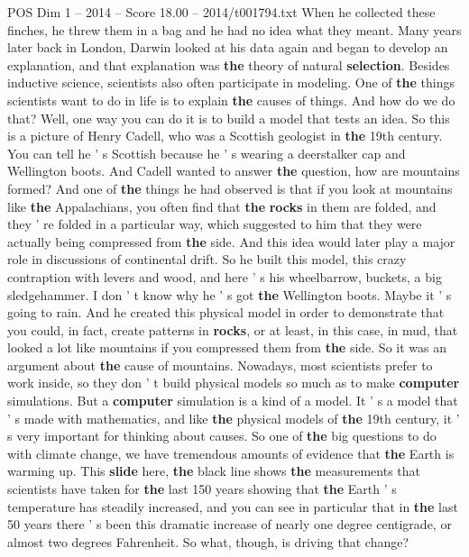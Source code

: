 \begin{textsample}{POS Dim 1 – 2014 – Score 18.00 – 2014/t001794.txt}
When he collected these finches, he threw them in a bag and he had no idea what they meant.
Many years later back in London, Darwin looked at his data again and began to develop an explanation, and that explanation was \textbf{the} theory of natural \textbf{selection}.
Besides inductive science, scientists also often participate in modeling.
One of \textbf{the} things scientists want to do in life is to explain \textbf{the} causes of things.
And how do we do that?
Well, one way you can do it is to build a model that tests an idea.
So this is a picture of Henry Cadell, who was a Scottish geologist in \textbf{the} 19th century.
You can tell he ' s Scottish because he ' s wearing a deerstalker cap and Wellington boots.
And Cadell wanted to answer \textbf{the} question, how are mountains formed?
And one of \textbf{the} things he had observed is that if you look at mountains like \textbf{the} Appalachians, you often find that \textbf{the} \textbf{rocks} in them are folded, and they ' re folded in a particular way, which suggested to him that they were actually being compressed from \textbf{the} side.
And this idea would later play a major role in discussions of continental drift.
So he built this model, this crazy contraption with levers and wood, and here ' s his wheelbarrow, buckets, a big sledgehammer.
I don ' t know why he ' s got \textbf{the} Wellington boots.
Maybe it ' s going to rain.
And he created this physical model in order to demonstrate that you could, in fact, create patterns in \textbf{rocks}, or at least, in this case, in mud, that looked a lot like mountains if you compressed them from \textbf{the} side.
So it was an argument about \textbf{the} cause of mountains.
Nowadays, most scientists prefer to work inside, so they don ' t build physical models so much as to make \textbf{computer} simulations.
But a \textbf{computer} simulation is a kind of a model.
It ' s a model that ' s made with mathematics, and like \textbf{the} physical models of \textbf{the} 19th century, it ' s very important for thinking about causes.
So one of \textbf{the} big questions to do with climate change, we have tremendous amounts of evidence that \textbf{the} Earth is warming up.
This \textbf{slide} here, \textbf{the} black line shows \textbf{the} measurements that scientists have taken for \textbf{the} last 150 years showing that \textbf{the} Earth ' s temperature has steadily increased, and you can see in particular that in \textbf{the} last 50 years there ' s been this dramatic increase of nearly one degree centigrade, or almost two degrees Fahrenheit.
So what, though, is driving that change?

\end{textsample}
